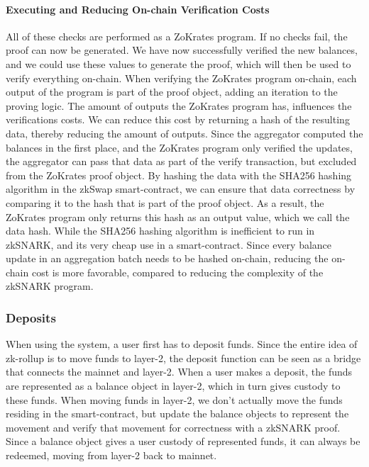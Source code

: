 \documentclass[../../thesis.tex]{subfiles}
\begin{document}
\paragraph{Executing and Reducing On-chain Verification Costs} \label{exec_and_reduce}
All of these checks are performed as a ZoKrates program. If no checks fail, the proof can now be generated.  We have now successfully verified the new balances, and we could use these values to generate the proof, which will then be used to verify everything on-chain. When verifying the ZoKrates program on-chain, each output of the program is part of the proof object, adding an iteration to the proving logic. The amount of outputs the ZoKrates program has, influences the verifications costs. We can reduce this cost by returning a hash of the resulting data, thereby reducing the amount of outputs. Since the aggregator computed the balances in the first place, and the ZoKrates program only verified the updates, the aggregator can pass that data as part of the verify transaction, but excluded from the ZoKrates proof object. By hashing the data with the SHA256 hashing algorithm in the zkSwap smart-contract, we can ensure that data correctness by comparing it to the hash that is part of the proof object. As a result, the ZoKrates program only returns this hash as an output value, which we call the data hash. While the SHA256 hashing algorithm is inefficient to run in zkSNARK, and its very cheap use in a smart-contract. Since every balance update in an aggregation batch needs to be hashed on-chain, reducing the on-chain cost is more favorable, compared to reducing the complexity of the zkSNARK program. 

\subsubsection{Deposits}
When using the system, a user first has to deposit funds. Since the entire idea of zk-rollup is to move funds to layer-2, the deposit function can be seen as a bridge that connects the mainnet and layer-2. When a user makes a deposit, the funds are represented as a balance object in layer-2, which in turn gives custody to these funds. When moving funds in layer-2, we don't actually move the funds residing in the smart-contract, but update the balance objects to represent the movement and verify that movement for correctness with a zkSNARK proof. Since a balance object gives a user custody of represented funds, it can always be redeemed, moving from layer-2 back to mainnet.  
\end{document}
